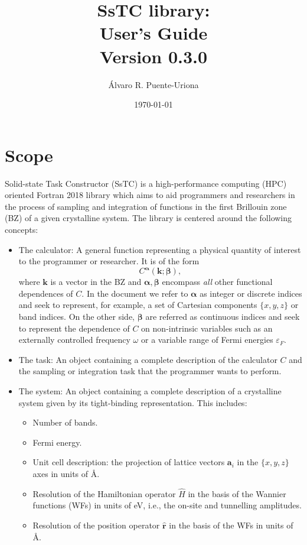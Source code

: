 \documentclass[10pt,a4paper]{article}
\title{SsTC library:\\
\large{User's Guide}\\
\large{Version 0.3.0}}
\author{Álvaro R. Puente-Uriona}
\date{\today}
\begin{document}
\maketitle
\tableofcontents
\clearpage
\newpage
\section{Scope}
Solid-state Task Constructor (SsTC) is a high-performance computing (HPC) oriented Fortran 2018 library which aims to aid programmers and researchers in the process of sampling and integration of functions in the first Brillouin zone (BZ) of a given crystalline system. The library is centered around the following concepts:
\begin{tcolorbox}\begin{itemize}
\item The calculator: A general function representing a physical quantity of interest to the programmer or researcher. It is of the form
\begin{equation}\label{eq:calculator}
C^{\bm{\alpha}}(\bm{k}; \bm{\beta}),
\end{equation}
where $\bm{k}$ is a vector in the BZ and $\bm{\alpha}, \bm{\beta}$ encompass \textit{all} other functional dependences of $C$. In the document we refer to $\bm{\alpha}$ as integer or discrete indices and seek to represent, for example, a set of Cartesian components $\{x, y, z\}$ or band indices. On the other side, $\bm{\beta}$ are referred as continuous indices and seek to represent the dependence of $C$ on non-intrinsic variables such as an externally controlled frequency $\omega$ or a variable range of Fermi energies $\varepsilon_F$.
\item The task: An object containing a complete description of the calculator $C$ and the sampling or integration task that the programmer wants to perform.
\item The system: An object containing a complete description of a crystalline system given by its tight-binding \cite{marzariMaximallyLocalizedWannier2012} representation. This includes:
\begin{tcolorbox}\begin{itemize}
\item Number of bands.
\item Fermi energy.
\item Unit cell description: the projection of lattice vectors $\bm{a}_i$ in the $\{x, y, z\}$ axes in units of \r{A}.
\item Resolution of the Hamiltonian operator $\hat{H}$ in the basis of the Wannier functions (WFs) \cite{marzariMaximallyLocalizedWannier2012} in units of eV, i.e., the on-site and tunnelling amplitudes.
\item Resolution of the position operator $\hat{\bm{r}}$ in the basis of the WFs in units of \r{A}.
\end{itemize}\end{tcolorbox}
\end{itemize}
\end{tcolorbox}
\end{document}
